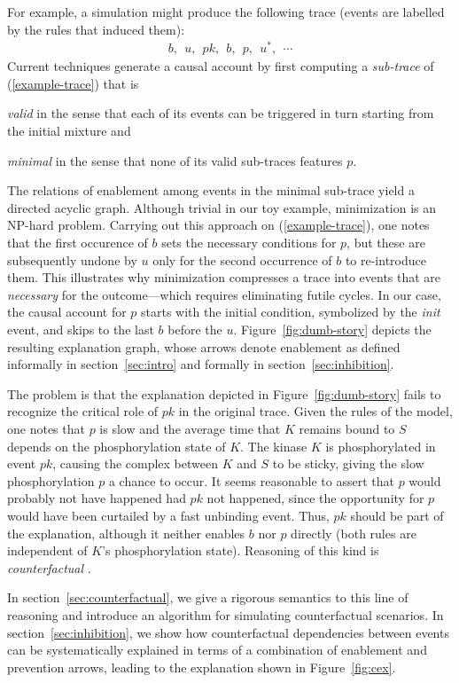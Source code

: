 For example, a simulation might produce the following trace (events
are labelled by the rules that induced them):
\begin{align}
  \label{example-trace} 
  b,\ \ u,\ \ pk,\ \ b,\ \ p,\ \ u^{*},\ \ \cdots
\end{align} 
Current techniques
\cite{DBLP:conf/fsttcs/DanosFFHH12,DanosEtAl-CONCUR07} generate a
causal account by first computing a \emph{sub-trace} of
(\ref{example-trace}) that is
\begin{inparaenum}[(i)]
\item \emph{valid} in the sense that each of its events can be
  triggered in turn starting from the initial mixture and
\item \emph{minimal} in the sense that none of its valid sub-traces
  features $p$.
\end{inparaenum}
The relations of enablement among events in the minimal sub-trace
yield a directed acyclic graph. Although trivial in our toy example,
minimization is an NP-hard problem. Carrying out this approach on
(\ref{example-trace}), one notes that the first occurence of $b$ sets
the necessary conditions for $p$, but these are subsequently undone by
$u$ only for the second occurrence of $b$ to re-introduce them. This
illustrates why minimization compresses a trace into events that are
\emph{necessary} for the outcome---which requires eliminating futile
cycles. In our case, the causal account for $p$ starts with the
initial condition, symbolized by the \emph{init} event, and skips to
the last $b$ before the $u$. Figure~\ref{fig:dumb-story} depicts the
resulting explanation graph, whose arrows denote enablement as defined
informally in section~\ref{sec:intro} and formally in
section~\ref{sec:inhibition}.



The problem is that the explanation depicted in
Figure~\ref{fig:dumb-story} fails to recognize the critical role of
$pk$ in the original trace. Given the rules of the model, one notes
that $p$ is slow and the average time that $K$ remains bound to $S$
depends on the phosphorylation state of $K$. The kinase $K$ is
phosphorylated in event $pk$, causing the complex between $K$ and $S$
to be sticky, giving the slow phosphorylation $p$ a chance to
occur. It seems reasonable to assert that $p$ would probably not have
happened had $pk$ not happened, since the opportunity for $p$ would
have been curtailed by a fast unbinding event. Thus, $pk$ should be
part of the explanation, although it neither enables $b$ nor $p$
directly (both rules are independent of $K$'s phosphorylation
state). Reasoning of this kind is \emph{counterfactual}
\cite{lewis1974causation,pearl2009causality}.

In section~\ref{sec:counterfactual}, we give a rigorous semantics to
this line of reasoning and introduce an algorithm for simulating
counterfactual scenarios. In section~\ref{sec:inhibition}, we show how
counterfactual dependencies between events can be systematically
explained in terms of a combination of enablement and prevention
arrows, leading to the explanation shown in Figure~\ref{fig:cex}. 
